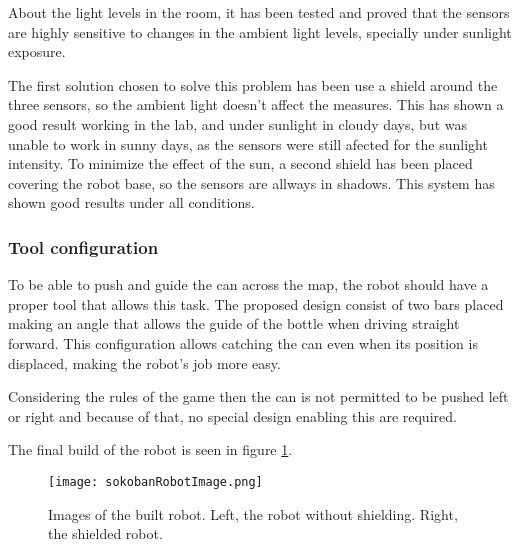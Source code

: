 About the light levels in the room, it has been tested and proved that the sensors are highly sensitive to changes in 
the ambient light levels, specially under sunlight exposure. 

The first solution chosen to solve this problem has been use a shield around the three sensors, so the ambient light 
doesn't affect the measures.
This has shown a good result working in the lab, and under sunlight in cloudy days, but was unable to work in sunny days,
as the sensors were still afected for the sunlight intensity.
To minimize the effect of the sun, a second shield has been placed covering the robot base, so the sensors are allways in
shadows.
This system has shown good results under all conditions.



\subsubsection{Tool configuration}

To be able to push and guide the can across the map, the robot should have a proper tool that allows this task. 
The proposed design consist of two bars placed making an angle that allows the guide of the bottle when driving straight forward.
This configuration allows catching the can even when its position is displaced, making the robot's job more easy.

Considering the rules of the game then the can is not permitted to be pushed left or right and because of that, no special design enabling this are required.


The final build of the robot is seen in figure \ref{fig:robotImage}.

\begin{figure}[H]
\texttt{[image: sokobanRobotImage.png]}
\centering
\caption{Images of the built robot. Left, the robot without shielding. Right, the shielded robot.}
\label{fig:robotImage}
\end{figure}

